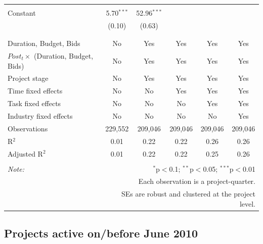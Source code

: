 \documentclass[
]{article}
\begin{document}
\begin{table}[H]
\begin{tabular}{@{\extracolsep{-2pt}}lccccc}
  & & & & & \\ 
 Constant & 5.70$^{***}$ & 52.96$^{***}$ &  &  &  \\ 
  & (0.10) & (0.63) &  &  &  \\ 
  & & & & & \\ 
\hline \\[-1.8ex] 
Duration, Budget, Bids & No & Yes & Yes & Yes & Yes \\ 
$Post_t \times $  (Duration, Budget, Bids) & No & Yes & Yes & Yes & Yes \\ 
Project stage & No & Yes & Yes & Yes & Yes \\ 
Time fixed effects & No & No & Yes & Yes & Yes \\ 
Task fixed effects & No & No & No & Yes & Yes \\ 
Industry fixed effects & No & No & No & No & Yes \\ 
Observations & 229,552 & 209,046 & 209,046 & 209,046 & 209,046 \\ 
R$^{2}$ & 0.01 & 0.22 & 0.22 & 0.26 & 0.26 \\ 
Adjusted R$^{2}$ & 0.01 & 0.22 & 0.22 & 0.25 & 0.26 \\ 
\hline 
\hline \\[-1.8ex] 
\textit{Note:}  & \multicolumn{5}{r}{$^{*}$p$<$0.1; $^{**}$p$<$0.05; $^{***}$p$<$0.01} \\ 
 & \multicolumn{5}{r}{Each observation is a project-quarter.} \\ 
 & \multicolumn{5}{r}{SEs are robust and clustered at the project level.} \\ 
\end{tabular} 
\end{table}

\hypertarget{projects-active-onbefore-june-2010-1}{%
\subsection{Projects active on/before June
2010}\label{projects-active-onbefore-june-2010-1}}
\end{document}
